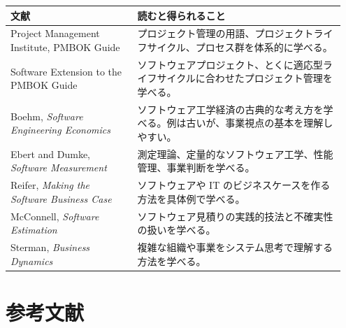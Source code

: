 \documentclass[a4paper,11pt]{article}
\begin{document}
\begin{longtable}{L{0.36\linewidth} L{0.59\linewidth}}
\toprule
\textbf{文献} & \textbf{読むと得られること} \\
\midrule
Project Management Institute, PMBOK Guide & プロジェクト管理の用語、プロジェクトライフサイクル、プロセス群を体系的に学べる。 \\
Software Extension to the PMBOK Guide & ソフトウェアプロジェクト、とくに適応型ライフサイクルに合わせたプロジェクト管理を学べる。 \\
Boehm, \textit{Software Engineering Economics} & ソフトウェア工学経済の古典的な考え方を学べる。例は古いが、事業視点の基本を理解しやすい。 \\
Ebert and Dumke, \textit{Software Measurement} & 測定理論、定量的なソフトウェア工学、性能管理、事業判断を学べる。 \\
Reifer, \textit{Making the Software Business Case} & ソフトウェアや IT のビジネスケースを作る方法を具体例で学べる。 \\
McConnell, \textit{Software Estimation} & ソフトウェア見積りの実践的技法と不確実性の扱いを学べる。 \\
Sterman, \textit{Business Dynamics} & 複雑な組織や事業をシステム思考で理解する方法を学べる。 \\
\bottomrule
\end{longtable}

\section{参考文献}
\end{document}
